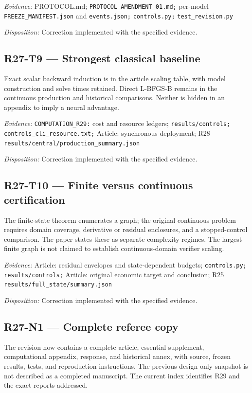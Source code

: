 \emph{Evidence:} PROTOCOL.md; \nolinkurl{PROTOCOL_AMENDMENT_01.md;} per-model \nolinkurl{FREEZE_MANIFEST.json} and \nolinkurl{events.json;} \nolinkurl{controls.py;} \nolinkurl{test_revision.py}

\emph{Disposition:} Correction implemented with the specified evidence.
\subsection{R27-T9 --- Strongest classical baseline}
Exact scalar backward induction is in the article scaling table, with model construction and solve times retained. Direct L-BFGS-B remains in the continuous production and historical comparisons. Neither is hidden in an appendix to imply a neural advantage.

\emph{Evidence:} \nolinkurl{COMPUTATION_R29:} cost and resource ledgers; \nolinkurl{results/controls;} \nolinkurl{controls_cli_resource.txt;} Article: synchronous deployment; R28 \nolinkurl{results/central/production_summary.json}

\emph{Disposition:} Correction implemented with the specified evidence.
\subsection{R27-T10 --- Finite versus continuous certification}
The finite-state theorem enumerates a graph; the original continuous problem requires domain coverage, derivative or residual enclosures, and a stopped-control comparison. The paper states these as separate complexity regimes. The largest finite graph is not claimed to establish continuous-domain verifier scaling.

\emph{Evidence:} Article: residual envelopes and state-dependent budgets; \nolinkurl{controls.py;} \nolinkurl{results/controls;} Article: original economic target and conclusion; R25 \nolinkurl{results/full_state/summary.json}

\emph{Disposition:} Correction implemented with the specified evidence.
\subsection{R27-N1 --- Complete referee copy}
The revision now contains a complete article, essential supplement, computational appendix, response, and historical annex, with source, frozen results, tests, and reproduction instructions. The previous design-only snapshot is not described as a completed manuscript. The current index identifies R29 and the exact reports addressed.

